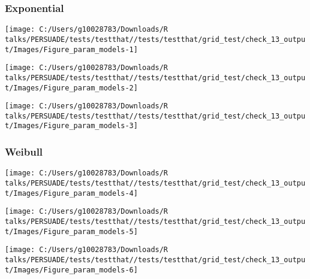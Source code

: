 \documentclass[
]{article}
\begin{document}
\clearpage

\clearpage

\subsubsection{Exponential}\label{exponential}

\begin{flushleft}\texttt{[image: C:/Users/g10028783/Downloads/R talks/PERSUADE/tests/testthat//tests/testthat/grid\_test/check\_13\_output/Images/Figure\_param\_models-1]} \end{flushleft}

\begin{flushleft}\texttt{[image: C:/Users/g10028783/Downloads/R talks/PERSUADE/tests/testthat//tests/testthat/grid\_test/check\_13\_output/Images/Figure\_param\_models-2]} \end{flushleft}

\begin{flushleft}\texttt{[image: C:/Users/g10028783/Downloads/R talks/PERSUADE/tests/testthat//tests/testthat/grid\_test/check\_13\_output/Images/Figure\_param\_models-3]} \end{flushleft}

\clearpage

\subsubsection{Weibull}\label{weibull}

\begin{flushleft}\texttt{[image: C:/Users/g10028783/Downloads/R talks/PERSUADE/tests/testthat//tests/testthat/grid\_test/check\_13\_output/Images/Figure\_param\_models-4]} \end{flushleft}

\begin{flushleft}\texttt{[image: C:/Users/g10028783/Downloads/R talks/PERSUADE/tests/testthat//tests/testthat/grid\_test/check\_13\_output/Images/Figure\_param\_models-5]} \end{flushleft}

\begin{flushleft}\texttt{[image: C:/Users/g10028783/Downloads/R talks/PERSUADE/tests/testthat//tests/testthat/grid\_test/check\_13\_output/Images/Figure\_param\_models-6]} \end{flushleft}
\end{document}
